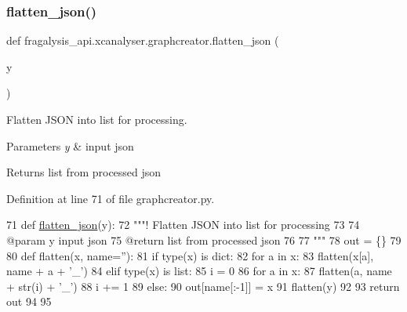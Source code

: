 \subsubsection{\texorpdfstring{flatten\+\_\+json()}{flatten\_json()}}
{\footnotesize\ttfamily def fragalysis\+\_\+api.\+xcanalyser.\+graphcreator.\+flatten\+\_\+json (\begin{DoxyParamCaption}\item[{}]{y }\end{DoxyParamCaption})}



Flatten J\+S\+ON into list for processing. 


\begin{DoxyParams}{Parameters}
{\em y} & input json \\
\hline
\end{DoxyParams}
\begin{DoxyReturn}{Returns}
list from processed json 
\end{DoxyReturn}


Definition at line 71 of file graphcreator.\+py.


\begin{DoxyCode}
71 \textcolor{keyword}{def }\hyperlink{namespacefragalysis__api_1_1xcanalyser_1_1graphcreator_a1c41339aa422a66c6dc643086aa5bfbb}{flatten\_json}(y):
72     \textcolor{stringliteral}{"""! Flatten JSON into list for processing}
73 \textcolor{stringliteral}{}
74 \textcolor{stringliteral}{    @param y input json}
75 \textcolor{stringliteral}{    @return list from processed json}
76 \textcolor{stringliteral}{}
77 \textcolor{stringliteral}{    """}
78     out = \{\}
79 
80     \textcolor{keyword}{def }flatten(x, name=''):
81         \textcolor{keywordflow}{if} type(x) \textcolor{keywordflow}{is} dict:
82             \textcolor{keywordflow}{for} a \textcolor{keywordflow}{in} x:
83                 flatten(x[a], name + a + \textcolor{stringliteral}{'\_'})
84         \textcolor{keywordflow}{elif} type(x) \textcolor{keywordflow}{is} list:
85             i = 0
86             \textcolor{keywordflow}{for} a \textcolor{keywordflow}{in} x:
87                 flatten(a, name + str(i) + \textcolor{stringliteral}{'\_'})
88                 i += 1
89         \textcolor{keywordflow}{else}:
90             out[name[:-1]] = x
91     flatten(y)
92 
93     \textcolor{keywordflow}{return} out
94 
95 
\end{DoxyCode}
\mbox{\label{namespacefragalysis__api_1_1xcanalyser_1_1graphcreator_a029a9d7dda209fb27d4268599330e8d3}} 
